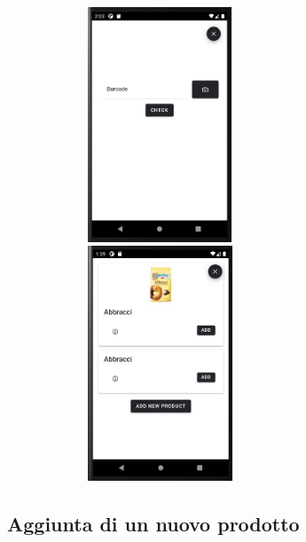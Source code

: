 \documentclass[11pt]{article}
\begin{document}
\begin{figure}
\centering
\begin{minipage}{.5\textwidth}
  \centering
\includegraphics[width=7cm,height=7cm,keepaspectratio]{Barcode}
\end{minipage}%
\begin{minipage}{.5\textwidth}
  \centering
\includegraphics[width=7cm,height=7cm,keepaspectratio]{Product_list}
\end{minipage}
\end{figure}

\subsection{Aggiunta di un nuovo prodotto}
\end{document}
